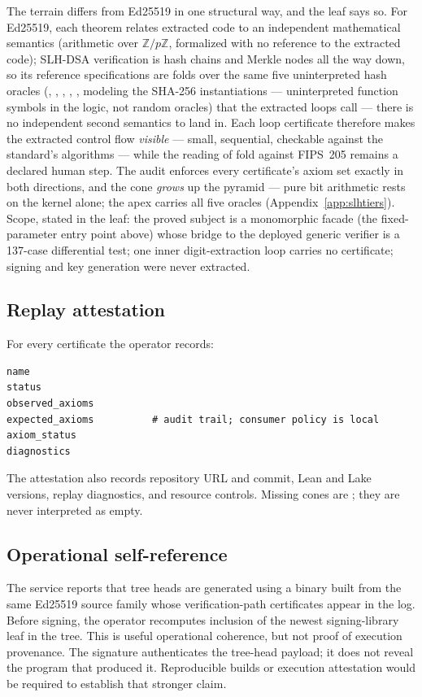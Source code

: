 \documentclass[11pt]{article}
\theoremstyle{remark}
\newcommand{\code}[1]{\texttt{\detokenize{#1}}}
\begin{document}
The terrain differs from Ed25519 in one structural way, and the leaf says so.
For Ed25519, each theorem relates extracted code to an independent
mathematical semantics (arithmetic over $\mathbb{Z}/p\mathbb{Z}$,
formalized with no reference to the extracted code); SLH-DSA verification
is hash chains and Merkle nodes all the way down, so its reference
specifications are folds over the same five uninterpreted hash oracles
(\code{h_msg}, \code{f}, \code{h}, \code{t_l}, \code{t_len}, modeling
the SHA-256 instantiations --- uninterpreted function symbols in the
logic, not random oracles) that the extracted loops call --- there is no
independent second semantics to land in. Each loop certificate therefore makes the extracted
control flow \emph{visible} --- small, sequential, checkable against the
standard's algorithms --- while the reading of fold against FIPS~205 remains
a declared human step. The audit enforces every certificate's axiom set
exactly in both directions, and the cone \emph{grows} up the pyramid ---
pure bit arithmetic rests on the kernel alone; the apex carries all five
oracles (Appendix~\ref{app:slhtiers}). Scope, stated in the leaf: the proved
subject is a monomorphic facade (the fixed-parameter entry point above)
whose bridge to the deployed generic verifier
is a 137-case differential test; one inner digit-extraction loop carries no
certificate; signing and key generation were never extracted.

\subsection{Replay attestation}

For every certificate the operator records:
\begin{lstlisting}
name
status
observed_axioms
expected_axioms          # audit trail; consumer policy is local
axiom_status
diagnostics
\end{lstlisting}
The attestation also records repository URL and commit, Lean and Lake versions,
replay diagnostics, and resource controls. Missing cones are
\code{unverifiable}; they are never interpreted as empty.

\subsection{Operational self-reference}

The service reports that tree heads are generated using a binary built from the
same Ed25519 source family whose verification-path certificates appear in the
log. Before signing, the operator recomputes inclusion of the newest
signing-library leaf in the tree. This is useful operational coherence, but not proof
of execution provenance. The signature authenticates the tree-head payload; it
does not reveal the program that produced it. Reproducible builds or execution
attestation would be required to establish that stronger claim.
\end{document}
